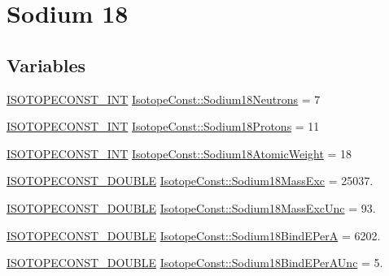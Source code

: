 \hypertarget{group___isotope_const-_sodium-_na18}{}\section{Sodium 18}
\label{group___isotope_const-_sodium-_na18}
\subsection*{Variables}
\begin{DoxyCompactItemize}
\item 
\mbox{\hyperlink{group___isotope_const-_macros_ga5f18360b3e99483a35c32d789e62621c}{I\+S\+O\+T\+O\+P\+E\+C\+O\+N\+S\+T\+\_\+\+I\+NT}} \mbox{\hyperlink{group___isotope_const-_sodium-_na18_gafb32b3f04b9bc5228e0eafd852e1b02b}{Isotope\+Const\+::\+Sodium18\+Neutrons}} = 7
\item 
\mbox{\hyperlink{group___isotope_const-_macros_ga5f18360b3e99483a35c32d789e62621c}{I\+S\+O\+T\+O\+P\+E\+C\+O\+N\+S\+T\+\_\+\+I\+NT}} \mbox{\hyperlink{group___isotope_const-_sodium-_na18_ga2027955b42b742d4354f99c39390720a}{Isotope\+Const\+::\+Sodium18\+Protons}} = 11
\item 
\mbox{\hyperlink{group___isotope_const-_macros_ga5f18360b3e99483a35c32d789e62621c}{I\+S\+O\+T\+O\+P\+E\+C\+O\+N\+S\+T\+\_\+\+I\+NT}} \mbox{\hyperlink{group___isotope_const-_sodium-_na18_ga161800ce89dc09d1d218e5f8e3204c2a}{Isotope\+Const\+::\+Sodium18\+Atomic\+Weight}} = 18
\item 
\mbox{\hyperlink{group___isotope_const-_macros_ga8f45a7272ce02c0b4c65c44636ed719a}{I\+S\+O\+T\+O\+P\+E\+C\+O\+N\+S\+T\+\_\+\+D\+O\+U\+B\+LE}} \mbox{\hyperlink{group___isotope_const-_sodium-_na18_gabda76113b84fea5dd12e393ca9ee3ea0}{Isotope\+Const\+::\+Sodium18\+Mass\+Exc}} = 25037.
\item 
\mbox{\hyperlink{group___isotope_const-_macros_ga8f45a7272ce02c0b4c65c44636ed719a}{I\+S\+O\+T\+O\+P\+E\+C\+O\+N\+S\+T\+\_\+\+D\+O\+U\+B\+LE}} \mbox{\hyperlink{group___isotope_const-_sodium-_na18_ga30668ee3cab56bcd4fce9dfb903f0321}{Isotope\+Const\+::\+Sodium18\+Mass\+Exc\+Unc}} = 93.
\item 
\mbox{\hyperlink{group___isotope_const-_macros_ga8f45a7272ce02c0b4c65c44636ed719a}{I\+S\+O\+T\+O\+P\+E\+C\+O\+N\+S\+T\+\_\+\+D\+O\+U\+B\+LE}} \mbox{\hyperlink{group___isotope_const-_sodium-_na18_gaa3286f614f358bcc0ce47aa2031e12d5}{Isotope\+Const\+::\+Sodium18\+Bind\+E\+PerA}} = 6202.
\item 
\mbox{\hyperlink{group___isotope_const-_macros_ga8f45a7272ce02c0b4c65c44636ed719a}{I\+S\+O\+T\+O\+P\+E\+C\+O\+N\+S\+T\+\_\+\+D\+O\+U\+B\+LE}} \mbox{\hyperlink{group___isotope_const-_sodium-_na18_ga1e217550378d187f5851f6023e80e818}{Isotope\+Const\+::\+Sodium18\+Bind\+E\+Per\+A\+Unc}} = 5.

\end{DoxyCompactItemize}
